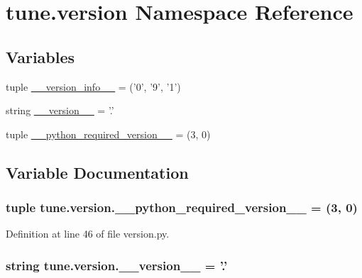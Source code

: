 \hypertarget{namespacetune_1_1version}{\section{tune.\-version Namespace Reference}
\label{namespacetune_1_1version}
}
\subsection*{Variables}
\begin{DoxyCompactItemize}
\item 
tuple \hyperlink{namespacetune_1_1version_a255c6d51f9903b9ca1fe52113542b20c}{\-\_\-\-\_\-version\-\_\-info\-\_\-\-\_\-} = ('0', '9', '1')
\item 
string \hyperlink{namespacetune_1_1version_a8d792efcdefa99553b49602c0510ed10}{\-\_\-\-\_\-version\-\_\-\-\_\-} = '.'
\item 
tuple \hyperlink{namespacetune_1_1version_a2d63f7a1e2cc50e699a5b575dc7997ae}{\-\_\-\-\_\-python\-\_\-required\-\_\-version\-\_\-\-\_\-} = (3, 0)
\end{DoxyCompactItemize}


\subsection{Variable Documentation}
\hypertarget{namespacetune_1_1version_a2d63f7a1e2cc50e699a5b575dc7997ae}{
\subsubsection[{\-\_\-\-\_\-python\-\_\-required\-\_\-version\-\_\-\-\_\-}]{\setlength{\rightskip}{0pt plus 5cm}tuple tune.\-version.\-\_\-\-\_\-python\-\_\-required\-\_\-version\-\_\-\-\_\- = (3, 0)}}\label{namespacetune_1_1version_a2d63f7a1e2cc50e699a5b575dc7997ae}


Definition at line 46 of file version.\-py.

\hypertarget{namespacetune_1_1version_a8d792efcdefa99553b49602c0510ed10}{
\subsubsection[{\-\_\-\-\_\-version\-\_\-\-\_\-}]{\setlength{\rightskip}{0pt plus 5cm}string tune.\-version.\-\_\-\-\_\-version\-\_\-\-\_\- = '.'}}\label{namespacetune_1_1version_a8d792efcdefa99553b49602c0510ed10}


